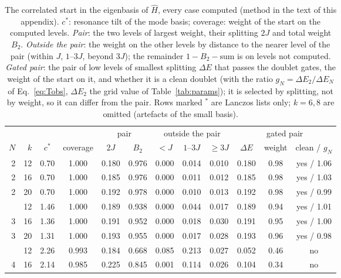 \begin{table}[ht]
\centering
\footnotesize
\setlength{\tabcolsep}{3.2pt}
\caption{The correlated start in the eigenbasis of $\hat H$, every case computed (method in the text of this appendix). $c^*$: resonance tilt of the mode basis; coverage: weight of the start on the computed levels. \emph{Pair}: the two levels of largest weight, their splitting $2J$ and total weight $B_2$. \emph{Outside the pair}: the weight on the other levels by distance to the nearer level of the pair (within $J$, $1$--$3J$, beyond $3J$); the remainder $1-B_2-\text{sum}$ is on levels not computed. \emph{Gated pair}: the pair of low levels of smallest splitting $\Delta E$ that passes the doublet gates, the weight of the start on it, and whether it is a clean doublet (with the ratio $g_N=\Delta E_2/\Delta E_N$ of Eq.~\eqref{eq:Tobs}, $\Delta E_2$ the grid value of Table~\ref{tab:params}); it is selected by splitting, not by weight, so it can differ from the pair. Rows marked $^\ast$ are Lanczos lists only; $k=6,8$ are omitted (artefacts of the small basis).}
\label{tab:start}
\begin{tabular}{rrcccccccccc}
\toprule
 & & & & \multicolumn{2}{c}{pair} & \multicolumn{3}{c}{outside the pair} & \multicolumn{3}{c}{gated pair} \\ \cmidrule(lr){5-6}\cmidrule(lr){7-9}\cmidrule(lr){10-12}
$N$ & $k$ & $c^*$ & coverage & $2J$ & $B_2$ & $<J$ & $1$--$3J$ & $\ge3J$ & $\Delta E$ & weight & clean / $g_N$ \\
\midrule
2 & 12 & 0.70 & 1.000 & 0.180 & 0.976 & 0.000 & 0.014 & 0.010 & 0.180 & 0.98 & yes / 1.06 \\
2 & 16 & 0.70 & 1.000 & 0.185 & 0.976 & 0.000 & 0.011 & 0.012 & 0.185 & 0.98 & yes / 1.03 \\
2 & 20 & 0.70 & 1.000 & 0.192 & 0.978 & 0.000 & 0.010 & 0.013 & 0.192 & 0.98 & yes / 0.99 \\
\addlinespace[2pt]
3 & 12 & 1.46 & 1.000 & 0.189 & 0.938 & 0.000 & 0.044 & 0.017 & 0.189 & 0.94 & yes / 1.01 \\
3 & 16 & 1.36 & 1.000 & 0.191 & 0.952 & 0.000 & 0.018 & 0.030 & 0.191 & 0.95 & yes / 1.00 \\
3 & 20 & 1.31 & 1.000 & 0.193 & 0.955 & 0.000 & 0.017 & 0.028 & 0.193 & 0.96 & yes / 0.98 \\
\addlinespace[2pt]
4 & 12 & 2.26 & 0.993 & 0.184 & 0.668 & 0.085 & 0.213 & 0.027 & 0.052 & 0.46 & no \\
4 & 16 & 2.14 & 0.985 & 0.225 & 0.845 & 0.001 & 0.114 & 0.026 & 0.104 & 0.34 & no \\

\end{tabular}
\end{table}

